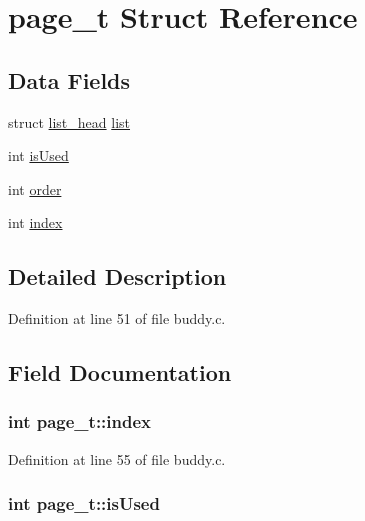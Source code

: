 \hypertarget{structpage__t}{}\section{page\+\_\+t Struct Reference}
\label{structpage__t}
\subsection*{Data Fields}
\begin{DoxyCompactItemize}
\item 
struct \hyperlink{structlist__head}{list\+\_\+head} \hyperlink{structpage__t_a97306c6fff4f6280e8e8049412091475}{list}
\item 
int \hyperlink{structpage__t_a2aba30a6ae50dcbe7c0362ce6eaddbef}{is\+Used}
\item 
int \hyperlink{structpage__t_aeb4724e8b59033b5373a965e16ce86ad}{order}
\item 
int \hyperlink{structpage__t_a006523076a191dd2fa60e23b2dfa6ef2}{index}
\end{DoxyCompactItemize}


\subsection{Detailed Description}


Definition at line 51 of file buddy.\+c.



\subsection{Field Documentation}
\subsubsection[{\texorpdfstring{index}{index}}]{\setlength{\rightskip}{0pt plus 5cm}int page\+\_\+t\+::index}\hypertarget{structpage__t_a006523076a191dd2fa60e23b2dfa6ef2}{}\label{structpage__t_a006523076a191dd2fa60e23b2dfa6ef2}


Definition at line 55 of file buddy.\+c.

\subsubsection[{\texorpdfstring{is\+Used}{isUsed}}]{\setlength{\rightskip}{0pt plus 5cm}int page\+\_\+t\+::is\+Used}\hypertarget{structpage__t_a2aba30a6ae50dcbe7c0362ce6eaddbef}{}\label{structpage__t_a2aba30a6ae50dcbe7c0362ce6eaddbef}


